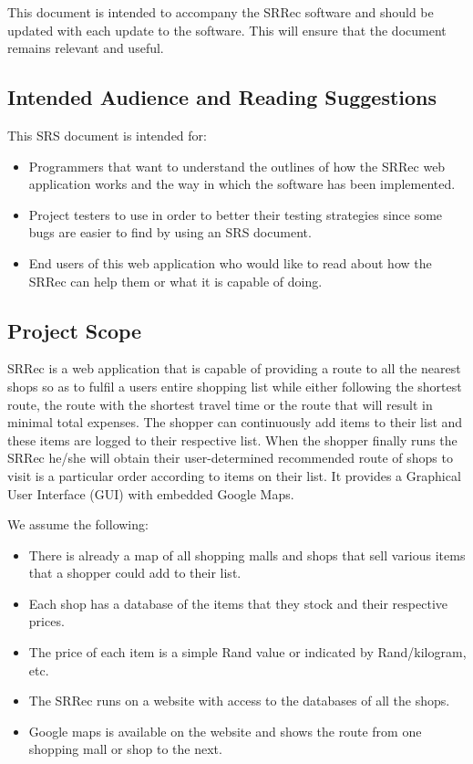 \documentclass[10pt, a4paper, onecolumn]{scrartcl}
\begin{document}
		This document is intended to accompany the SRRec software and should be updated with each update to the software. This will ensure that the document remains relevant and useful.
		
		\subsection{Intended Audience and Reading Suggestions}
		
		This SRS document is intended for:
		\begin{itemize}
			\item Programmers that want to understand the outlines of how the SRRec web application works and the way in which the software has been implemented.
			\item Project testers to use in order to better their testing strategies since some bugs are easier to find by using an SRS document.
			\item End users of this web application who would like to read about how the SRRec can help them or what it is capable of doing.
		\end{itemize}
		
		\subsection{Project Scope}
		
		SRRec is a web application that is capable of providing a route to all the nearest shops so as to fulfil a users entire shopping list while either following the shortest route, the route with the shortest travel time or the route that will result in minimal total expenses. The shopper can continuously add items to their list and these items are logged to their respective list. When the shopper finally runs the SRRec he/she will obtain their user-determined recommended route of shops to visit is a particular order according to items on their list. It provides a Graphical User Interface (GUI) with embedded Google Maps.
		
		We assume the following:
		\begin{itemize}
			\item There is already a map of all shopping malls and shops that sell various items that a shopper could add to their list.
			\item Each shop has a database of the items that they stock and their respective prices.
			\item The price of each item is a simple Rand value or indicated by Rand/kilogram, etc.
			\item The SRRec runs on a website with access to the databases of all the shops.
			\item Google maps is available on the website and shows the route from one shopping mall or shop to the next.
		\end{itemize}
		
\end{document}

